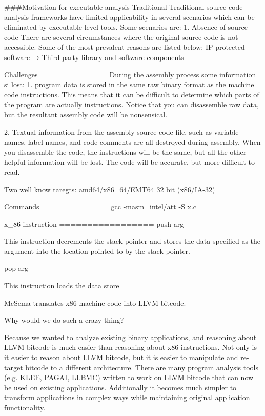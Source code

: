 ###Motivation for executable analysis Traditional
Traditional source-code analysis
frameworks have limited applicability in several scenarios which can be 
eliminated by  executable-level tools.
Some scenarios are:
1. Absence of source-code 
There are several circumstances where the original
source-code is not accessible. Some of the most prevalent reasons are listed
below: 
IP-protected software → Third-party library and software components



Challenges ============ During the assembly process some information si lost:
1. program data is stored in the same raw binary format as the machine code
instructions.  This means that it can be difficult to determine which parts of
the program are actually instructions. Notice that you can disassemble raw
data, but the resultant assembly code will be nonsensical. 

2. Textual information from the assembly source code file, such as variable
names, label names, and code comments are all destroyed during assembly. When
you disassemble the code, the instructions will be the same, but all the other
helpful information will be lost. The code will be accurate, but more difficult
to read.



Two well know taregts: amd64/x86_64/EMT64 32 bit (x86/IA-32)




Commands ============ gcc -masm=intel/att -S x.c




x_86 instruction ================= push arg

This instruction decrements the stack pointer and stores the data specified as
the argument into the location pointed to by the stack pointer.

pop arg

This instruction loads the data store




McSema translates x86 machine code into LLVM bitcode.

Why would we do such a crazy thing?

Because we wanted to analyze existing binary applications, and reasoning about
LLVM bitcode is much easier than reasoning about x86 instructions. Not only is
it easier to reason about LLVM bitcode, but it is easier to manipulate and
re-target bitcode to a different architecture. There are many program analysis
tools (e.g. KLEE, PAGAI, LLBMC) written to work on LLVM bitcode that can now be
used on existing applications. Additionally it becomes much simpler to
transform applications in complex ways while maintaining original application
functionality.

